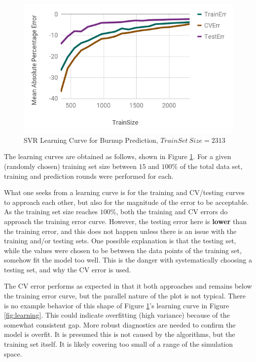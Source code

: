 \begin{figure}[!htb]
    \centering
    \includegraphics[width=\linewidth]{./chapters/method/lc1.png}
    \caption{\acrshort{SVR} Learning Curve for Burnup Prediction, $TrainSet\ Size = 2313$}
    \label{fig:lc1}
\end{figure}

The learning curves are obtained as follows, shown in Figure \ref{fig:lc1}.
For a given (randomly chosen) training set size between $15$ and $100\%$ of the
total data set, training and prediction rounds were performed for each. 

What one seeks from a learning curve is for the training and \gls{CV}/testing
curves to approach each other, but also for the magnitude of the error to be
acceptable. As the training set size reaches $100\%$, both the training and
\gls{CV} errors do approach the training error curve.  However, the testing
error here is \textbf{lower} than the training error, and this does not happen
unless there is an issue with the training and/or testing sets. One possible
explanation is that the testing set, while the values were chosen to be between
the data points of the training set, somehow fit the model too well. This is
the danger with systematically choosing a testing set, and why the \gls{CV}
error is used. 

The \gls{CV} error performs as expected in that it both approaches and remains
below the training error curve, but the parallel nature of the plot is not
typical. There is no example behavior of this shape of Figure \ref{fig:lc1}'s
learning curve in Figure \ref{fig:learning}. This could indicate overfitting
(high variance) because of the somewhat consistent gap.  More robust
diagnostics are needed to confirm the model is overfit.  It is presumed this is
not caused by the algorithms, but the training set itself.  It is likely
covering too small of a range of the simulation space.

